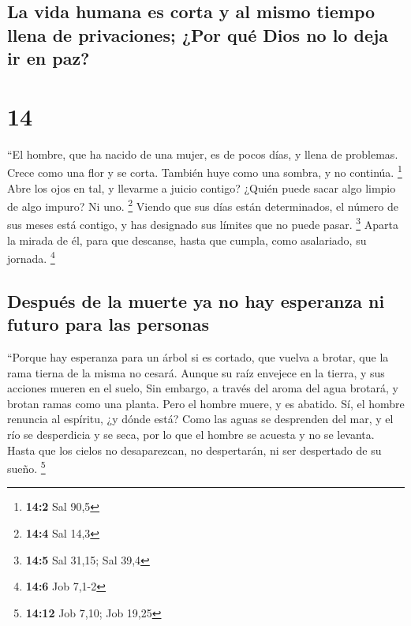 \begin{paracol}{2}
\hypertarget{la-vida-humana-es-corta-y-al-mismo-tiempo-llena-de-privaciones-por-quuxe9-dios-no-lo-deja-ir-en-paz}{%
\subsection{La vida humana es corta y al mismo tiempo llena de
privaciones; ¿Por qué Dios no lo deja ir en
paz?}\label{la-vida-humana-es-corta-y-al-mismo-tiempo-llena-de-privaciones-por-quuxe9-dios-no-lo-deja-ir-en-paz}}

\hypertarget{section-26}{%
\section{14}\label{section-26}}

 ``El hombre, que ha nacido de una mujer, es de pocos
días, y llena de problemas.  Crece como una flor y se
corta. También huye como una sombra, y no continúa. \footnote{\textbf{14:2}
  Sal 90,5}  Abre los ojos en tal, y llevarme a juicio
contigo?  ¿Quién puede sacar algo limpio de algo impuro?
Ni uno. \footnote{\textbf{14:4} Sal 14,3}  Viendo que sus
días están determinados, el número de sus meses está contigo, y has
designado sus límites que no puede pasar. \footnote{\textbf{14:5} Sal
  31,15; Sal 39,4}  Aparta la mirada de él, para que
descanse, hasta que cumpla, como asalariado, su jornada. \footnote{\textbf{14:6}
  Job 7,1-2}

\hypertarget{despuuxe9s-de-la-muerte-ya-no-hay-esperanza-ni-futuro-para-las-personas}{%
\subsection{Después de la muerte ya no hay esperanza ni futuro para las
personas}\label{despuuxe9s-de-la-muerte-ya-no-hay-esperanza-ni-futuro-para-las-personas}}

 ``Porque hay esperanza para un árbol si es cortado, que
vuelva a brotar, que la rama tierna de la misma no cesará.
 Aunque su raíz envejece en la tierra, y sus acciones
mueren en el suelo,  Sin embargo, a través del aroma del
agua brotará, y brotan ramas como una planta.  Pero el
hombre muere, y es abatido. Sí, el hombre renuncia al espíritu, ¿y dónde
está?  Como las aguas se desprenden del mar, y el río se
desperdicia y se seca,  por lo que el hombre se acuesta y
no se levanta. Hasta que los cielos no desaparezcan, no despertarán, ni
ser despertado de su sueño. \footnote{\textbf{14:12} Job 7,10; Job 19,25}


\end{paracol}
